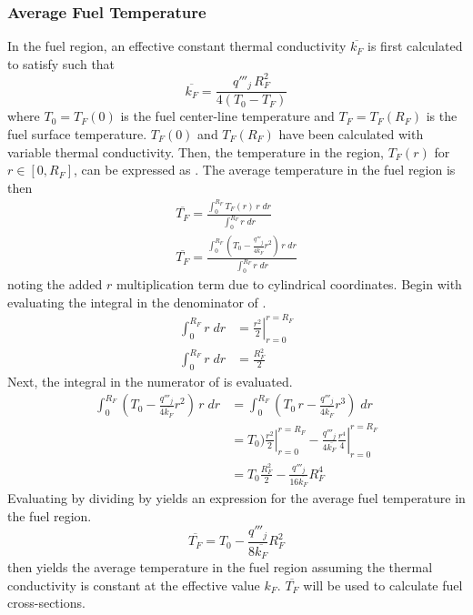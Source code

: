     \subsubsection{Average Fuel Temperature}
      In the fuel region, an effective constant thermal conductivity
      $\overline{k_F}$ is first calculated to satisfy
       such that
      \begin{equation}
        \overline{k_F} = \frac{q'''_j \, R_F^2}{4(T_0-T_F)}
      \end{equation}
      where $T_0 = T_F(0)$ is the fuel center-line temperature and
      $T_F=T_F(R_F)$ is the fuel surface temperature.
      $T_F(0)$ and $T_F(R_F)$ have been calculated with variable thermal
      conductivity. Then, the temperature in the region, $T_F(r)$ for $r \in 
      [0,R_F]$, can be expressed as . The average temperature in
      the fuel region is then
      \begin{align}
        \overline{T_F} = \frac{\int_0^{R_F} T_F(r) \, r \; dr}
          {\int_0^{R_F} r \; dr} \\
        \label{eq:tfbar_integral}
        \overline{T_F} = \frac{\int_0^{R_F} \left( T_0 - 
          \frac{q'''_j}{4 \overline{k_F}}
          r^2\right) \, r \; dr}{\int_0^{R_F} r \; dr}
      \end{align}
      noting the added $r$ multiplication term due to cylindrical coordinates.
      Begin with evaluating the integral in the denominator of
      .
      \begin{align}
        \int_0^{R_F} r \; dr &= \left. \frac{r^2}{2} \right|_{r=0}^{r=R_F} \\
        \label{eq:tf_denominator}
        \int_0^{R_F} r \; dr &= \frac{R_F^2}{2}
      \end{align}
      Next, the integral in the numerator of  is 
      evaluated.
      \begin{align}
        \int_0^{R_F} \left( T_0 - \frac{q'''_j}{4 \overline{k_F}} r^2 \right)
          \, r \; dr&= 
          \int_0^{R_F} \left( T_0 \, r - \frac{q'''_j}{4\overline{k_F}} 
          r^3 \right) \; dr\\
        &= \left. T_0) \frac{r^2}{2} \right|_{r=0}^{r=R_F} -
          \left. \frac{q'''_j}{4 \overline{k_F}} \frac{r^4}{4} 
          \right|_{r=0}^{r=R_F} \\
        \label{eq:tf_numerator}
        &= T_0 \frac{R_F^2}{2} - \frac{q'''_j}{16 \overline{k_F}} R_F^4
      \end{align}
      Evaluating  by dividing  by
       yields an expression for the average fuel
      temperature in the fuel region.
      \begin{equation}
        \label{eq:tf_bar}
        \overline{T_F} = T_0 - \frac{q'''_j}{8 \overline{k_F}} R_F^2
      \end{equation}
       then yields the average temperature in the fuel region
      assuming the thermal conductivity is constant at the effective value
      $k_F$. $\overline{T_F}$ will be used to calculate fuel cross-sections. 

